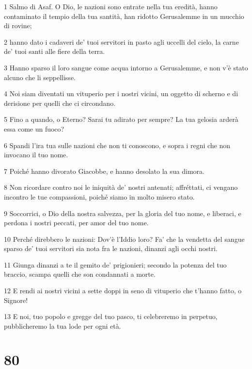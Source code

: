 \par 1 Salmo di Asaf. O Dio, le nazioni sono entrate nella tua eredità, hanno contaminato il tempio della tua santità, han ridotto Gerusalemme in un mucchio di rovine;
\par 2 hanno dato i cadaveri de' tuoi servitori in pasto agli uccelli del cielo, la carne de' tuoi santi alle fiere della terra.
\par 3 Hanno sparso il loro sangue come acqua intorno a Gerusalemme, e non v'è stato alcuno che li seppellisse.
\par 4 Noi siam diventati un vituperio per i nostri vicini, un oggetto di scherno e di derisione per quelli che ci circondano.
\par 5 Fino a quando, o Eterno? Sarai tu adirato per sempre? La tua gelosia arderà essa come un fuoco?
\par 6 Spandi l'ira tua sulle nazioni che non ti conoscono, e sopra i regni che non invocano il tuo nome.
\par 7 Poiché hanno divorato Giacobbe, e hanno desolato la sua dimora.
\par 8 Non ricordare contro noi le iniquità de' nostri antenati; affréttati, ci vengano incontro le tue compassioni, poiché siamo in molto misero stato.
\par 9 Soccorrici, o Dio della nostra salvezza, per la gloria del tuo nome, e liberaci, e perdona i nostri peccati, per amor del tuo nome.
\par 10 Perché direbbero le nazioni: Dov'è l'Iddio loro? Fa' che la vendetta del sangue sparso de' tuoi servitori sia nota fra le nazioni, dinanzi agli occhi nostri.
\par 11 Giunga dinanzi a te il gemito de' prigionieri; secondo la potenza del tuo braccio, scampa quelli che son condannati a morte.
\par 12 E rendi ai nostri vicini a sette doppi in seno di vituperio che t'hanno fatto, o Signore!
\par 13 E noi, tuo popolo e gregge del tuo pasco, ti celebreremo in perpetuo, pubblicheremo la tua lode per ogni età.

\chapter{80}

